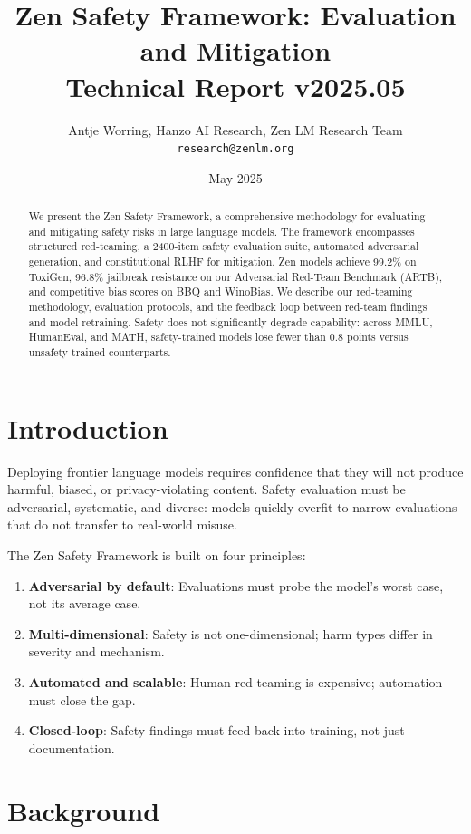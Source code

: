 \documentclass[11pt,a4paper]{article}
\title{\textbf{Zen Safety Framework: Evaluation and Mitigation}\\
\large Technical Report v2025.05}
\author{Antje Worring, Hanzo AI Research, Zen LM Research Team\\
\texttt{research@zenlm.org}}
\date{May 2025}
\begin{document}
\maketitle

\begin{abstract}
We present the Zen Safety Framework, a comprehensive methodology for evaluating and
mitigating safety risks in large language models. The framework encompasses structured
red-teaming, a 2400-item safety evaluation suite, automated adversarial generation,
and constitutional RLHF for mitigation. Zen models achieve 99.2\% on ToxiGen,
96.8\% jailbreak resistance on our Adversarial Red-Team Benchmark (ARTB), and
competitive bias scores on BBQ and WinoBias. We describe our red-teaming methodology,
evaluation protocols, and the feedback loop between red-team findings and model
retraining. Safety does not significantly degrade capability: across MMLU, HumanEval,
and MATH, safety-trained models lose fewer than 0.8 points versus unsafety-trained
counterparts.
\end{abstract}

\section{Introduction}

Deploying frontier language models requires confidence that they will not produce
harmful, biased, or privacy-violating content. Safety evaluation must be adversarial,
systematic, and diverse: models quickly overfit to narrow evaluations that do not
transfer to real-world misuse.

The Zen Safety Framework is built on four principles:
\begin{enumerate}
  \item \textbf{Adversarial by default}: Evaluations must probe the model's worst case, not its average case.
  \item \textbf{Multi-dimensional}: Safety is not one-dimensional; harm types differ in severity and mechanism.
  \item \textbf{Automated and scalable}: Human red-teaming is expensive; automation must close the gap.
  \item \textbf{Closed-loop}: Safety findings must feed back into training, not just documentation.
\end{enumerate}

\section{Background}
\end{document}
